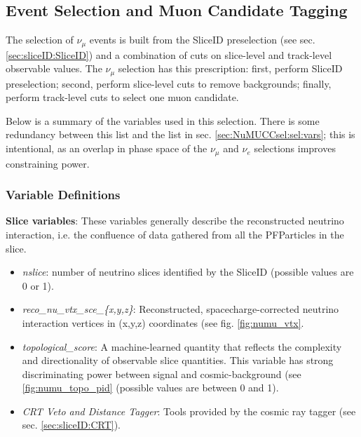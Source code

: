 \label{sec:NuMUCCsel}

\subsection{Event Selection and Muon Candidate Tagging}
\label{ssec:NuMUCCsel:sel}

\par The selection of $\nu_{\mu}$ events is built from the SliceID preselection (see sec. \ref{sec:sliceID:SliceID}) and a combination of cuts on slice-level and track-level observable values. The $\nu_{\mu}$ selection has this prescription: first, perform SliceID preselection; second, perform slice-level cuts to remove backgrounds; finally, perform track-level cuts to select one muon candidate.
\par Below is a summary of the variables used in this selection. There is some redundancy between this list and the list in sec. \ref{sec:NuMUCCsel:sel:vars}; this is intentional, as an overlap in phase space of the $\nu_{\mu}$ and $\nu_{e}$ selections improves constraining power.

\subsubsection{Variable Definitions}
\label{sssec:NuMUCCsel:sel:vars}

\par \noindent \textbf{Slice variables}: These variables generally describe the reconstructed neutrino interaction, i.e. the confluence of data gathered from all the PFParticles in the slice.
\begin{itemize}
    \item \emph{nslice}: number of neutrino slices identified by the SliceID (possible values are 0 or 1).
    \item \emph{reco\_nu\_vtx\_sce\_\{x,y,z\}}: Reconstructed, spacecharge-corrected neutrino interaction vertices in (x,y,z) coordinates (see fig. \ref{fig:numu_vtx}.
    \item \emph{topological\_score}: A machine-learned quantity that reflects the complexity and directionality of observable slice quantities. This variable has strong discriminating power between signal and cosmic-background (see \ref{fig:numu_topo_pid} (possible values are between 0 and 1).
    \item \emph{CRT Veto and Distance Tagger}: Tools provided by the cosmic ray tagger (see sec. \ref{sec:sliceID:CRT}).
\end{itemize}

